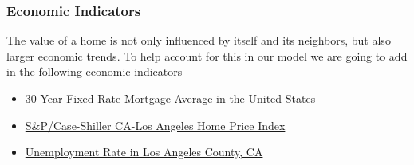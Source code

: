 \documentclass[]{book}
\providecommand{\tightlist}{%
  \setlength{\itemsep}{0pt}\setlength{\parskip}{0pt}}
\theoremstyle{definition}
\theoremstyle{definition}
\theoremstyle{definition}
\theoremstyle{remark}
\begin{document}
\subsubsection{Economic Indicators}\label{economic-indicators}

The value of a home is not only influenced by itself and its neighbors,
but also larger economic trends. To help account for this in our model
we are going to add in the following economic indicators

\begin{itemize}
\tightlist
\item
  \href{https://fred.stlouisfed.org/series/MORTGAGE30US}{30-Year Fixed
  Rate Mortgage Average in the United States}
\item
  \href{https://fred.stlouisfed.org/series/LXXRSA}{S\&P/Case-Shiller
  CA-Los Angeles Home Price Index}
\item
  \href{https://fred.stlouisfed.org/series/CALOSA7URN}{Unemployment Rate
  in Los Angeles County, CA}
\end{itemize}
\end{document}
